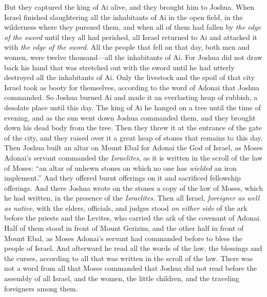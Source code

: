 \begin{biblechapter}
\verse But they captured the king of Ai alive, and they brought him to Joshua.
\verse When Israel finished slaughtering all the inhabitants of Ai in the open field, in the wilderness where they pursued them, and when all of them had fallen by \textit{the edge of the sword} until they all had perished, all Israel returned to Ai and attacked it with \textit{the edge of the sword}.
\verse All the people that fell on that day, both men and women, were twelve thousand—all the inhabitants of Ai.
\verse For Joshua did not draw back his hand that was stretched out with the sword until he had utterly destroyed all the inhabitants of Ai.
\verse Only the livestock and the spoil of that city Israel took as booty for themselves, according to the word of Adonai that Joshua commanded.
\verse So Joshua burned Ai and made it an everlasting heap of rubbish, a desolate place until this day.
\verse The king of Ai he hanged on a tree until the time of evening, and as the sun went down Joshua commanded them, and they brought down his dead body from the tree. Then they threw it at the entrance of the gate of the city, and they raised over it a great heap of stones that remains to this day.
 Then Joshua built an altar on Mount Ebal for Adonai the God of Israel,
\verse as Moses Adonai’s servant commanded the \textit{Israelites}, as it is written in the scroll of the law of Moses: “an altar of unhewn stones on which no one has \textit{wielded} an iron implement.” And they offered burnt offerings on it and sacrificed fellowship offerings.
\verse And there Joshua wrote on the stones a copy of the law of Moses, which he had written, in the presence of the \textit{Israelites}.
\verse Then all Israel, \textit{foreigner as well as native}, with the elders, officials, and judges stood \textit{on either side} of the ark before the priests and the Levites, who carried the ark of the covenant of Adonai. Half of them stood in front of Mount Gerizim, and the other half in front of Mount Ebal, as Moses Adonai’s servant had commanded before to bless the people of Israel.
\verse And afterward he read all the words of the law, the blessings and the curses, according to all that was written in the scroll of the law.
\verse There was not a word from all that Moses commanded that Joshua did not read before the assembly of all Israel, and the women, the little children, and the traveling foreigners among them.
\end{biblechapter}

